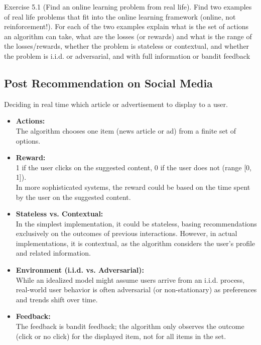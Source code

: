 Exercise 5.1 (Find an online learning problem from real life). Find two examples of real life problems
that fit into the online learning framework (online, not reinforcement!). For each of the two examples
explain what is the set of actions an algorithm can take, what are the losses (or rewards) and what is the
range of the losses/rewards, whether the problem is stateless or contextual, and whether the problem is
i.i.d. or adversarial, and with full information or bandit feedback

\subsection{Post Recommendation on Social Media}

Deciding in real time which article or advertisement to display to a user.

\begin{itemize}
\item \textbf{Actions:} \\
The algorithm chooses one item (news article or ad) from a finite set of options.

\item \textbf{Reward:} \\
1 if the user clicks on the suggested content, 0 if the user does not (range [0, 1]). \\
In more sophisticated systems, the reward could be based on the time spent by the user on the suggested content.

\item \textbf{Stateless vs. Contextual:} \\
In the simplest implementation, it could be stateless, basing recommendations exclusively on the outcomes of previous interactions.
However, in actual implementations, it is contextual, as the algorithm considers the user's profile and related information.

\item \textbf{Environment (i.i.d. vs. Adversarial):} \\
While an idealized model might assume users arrive from an i.i.d. process, real-world user behavior is often adversarial (or non-stationary) as preferences and trends shift over time.

\item \textbf{Feedback:} \\
The feedback is bandit feedback; the algorithm only observes the outcome (click or no click) for the displayed item, not for all items in the set.
\end{itemize}

